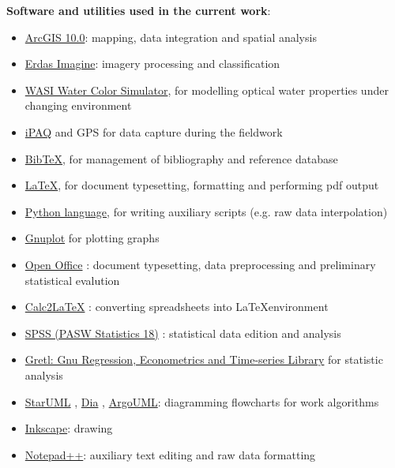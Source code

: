 \documentclass[10pt, a4paper]{article}
\begin{document}
	\textbf{Software and utilities used in the current work}:\\
	\begin{itemize}
		\item \href{http://www.esri.com/software/arcgis/index.html}{ArcGIS 10.0}: mapping, data integration and spatial analysis
		\item \href{http://www.erdas.com/products/ERDASIMAGINE/ERDASIMAGINE/Details.aspx}{Erdas Imagine}: imagery processing and 					classification
		\item \href{http://www.filewatcher.com/b/ftp/ftp.dfd.dlr.de/pub/WASI.0.0.html}{WASI Water Color Simulator}, for modelling optical water 					properties under changing environment
		\item \href{http://welcome.hp.com/country/us/en/prodserv/handheld.html}{iPAQ} and GPS for data capture during the fieldwork
		\item \href{http://www.bibtex.org/de/}{BibTeX}, for management of bibliography and reference database
		\item \href{http://www.latex-project.org/}{\LaTeX}, for document typesetting, formatting and performing pdf output
		\item \href{http://www.python.org/}{Python language}, for writing auxiliary scripts (e.g. raw data interpolation)
		\item \href{http://www.gnuplot.info/}{Gnuplot} for plotting graphs
		\item \href{http://www.openoffice.org/}{Open Office} : document typesetting, data preprocessing and preliminary statistical evalution
		\item \href{http://calc2latex.sourceforge.net/}{Calc2LaTeX} : converting spreadsheets into \LaTeX environment
		\item \href{http://www.spss.com/}{SPSS (PASW Statistics 18)} : statistical data edition and analysis 
		\item \href{http://gretl.sourceforge.net/}{Gretl: Gnu Regression, Econometrics and Time-series Library} for statistic analysis
		\item \href{http://staruml.sourceforge.net/en/}{StarUML} , \href{http://live.gnome.org/Dia}{Dia} , \href{http://argouml.tigris.org/}						{ArgoUML}: diagramming flowcharts for work algorithms
		\item \href{http://inkscape.org/}{Inkscape}: drawing
		\item \href{http://www.notepad-plus-plus.org/}{Notepad++}: auxiliary text editing and raw data formatting
	\end{itemize}
\pagebreak
\end{document}
